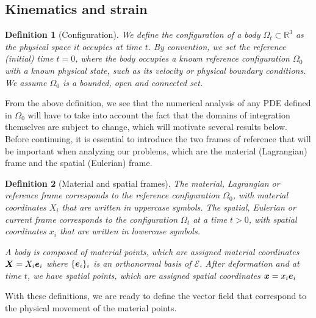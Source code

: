 \documentclass{article}
\renewcommand{\vec}{\vectorsym}
\newtheorem{definition}{Definition}
\newcommand{\R}{\mathbb{R}}
\begin{document}
\subsection{Kinematics and strain}
\begin{definition}[Configuration]
    We define the \textit{configuration} of a body $\Omega_t\subset \R^3$ as the physical space it occupies at time $t$. By convention, we set the reference (initial) time $t=0$, where the body occupies a known \textit{reference configuration} $\Omega_0$ with a known physical state, such as its velocity or physical boundary conditions. We assume $\Omega_0$ is a bounded, open and connected set.
\end{definition}
From the above definition, we see that the numerical analysis of any PDE defined in $\Omega_0$ will have to take into account the fact that the domains of integration themselves are subject to change, which will motivate several results below. Before continuing, it is essential to introduce the two frames of reference that will be important when analyzing our problems, which are the material (Lagrangian) frame and the spatial (Eulerian) frame. 
\begin{definition}[Material and spatial frames]
    The material, Lagrangian or reference frame corresponds to the reference configuration $\Omega_0$, with material coordinates $X_i$ that are written in uppercase symbols. The spatial, Eulerian or current frame corresponds to the configuration $\Omega_t$ at a time $t>0$, with spatial coordinates $x_i$ that are written in lowercase symbols. 

    A body is composed of \textit{material points}, which are assigned material coordinates $\vec X=X_i\vec e_i$ where $\{\vec e_i\}_i$ is an orthonormal basis of $\mathcal{E}$. After deformation and at time $t$, we have \textit{spatial points}, which are assigned spatial coordinates $\vec x = x_i\vec e_i$
\end{definition}
With these definitions, we are ready to define the vector field that correspond to the physical movement of the material points. 
\end{document}
